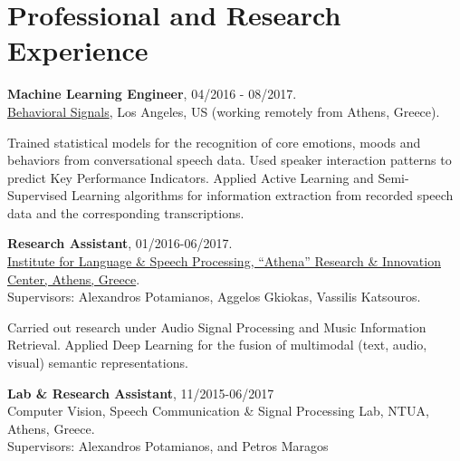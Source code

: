 \documentclass[letterpaper]{article}
\renewenvironment{itemize}{
  \begin{list}{}{
    \setlength{\leftmargin}{1.5em}
  }
}{
  \end{list}
}
\begin{document}
\section*{Professional and Research Experience}

\begin{itemize}

\item 
    \textbf{Machine Learning Engineer}, 04/2016 - 08/2017.\\ 
    \href{https://behavioralsignals.com/}{Behavioral Signals}, Los Angeles, US (working remotely from Athens, Greece).
    \begin{itemize}
    \item Trained statistical models for the recognition of core emotions, moods and behaviors from conversational speech data. Used speaker interaction patterns to predict Key Performance Indicators. Applied Active Learning and Semi-Supervised Learning algorithms for information extraction from recorded speech data and the corresponding transcriptions.
    \end{itemize}


    
    

\item 
    \textbf{Research Assistant}, 01/2016-06/2017.\\
    \href{http://www.ilsp.gr/en}{Institute for Language \& Speech Processing, ``Athena'' Research \& Innovation Center, Athens, Greece}.\\
    Supervisors: Alexandros Potamianos, Aggelos Gkiokas, Vassilis Katsouros.


    \begin{itemize}
    \item 
        Carried out research under Audio Signal Processing and Music Information Retrieval. Applied Deep Learning for the fusion of multimodal (text, audio, visual) semantic representations. 
    \end{itemize}
\iffalse
\item 
    \textbf{Lab \& Research Assistant}, 11/2015-06/2017\\
    Computer Vision, Speech Communication \& Signal Processing Lab, NTUA, Athens, Greece.\\
    Supervisors: Alexandros Potamianos, and Petros Maragos


\end{itemize}
\end{document}
